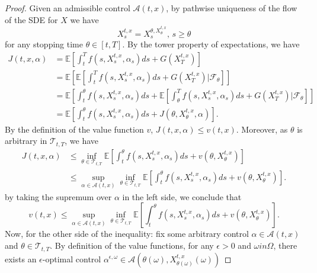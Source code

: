 \begin{proof}
    Given an admissible control $\mathcal{A}(t,x)$, by pathwise uniqueness of the flow of the SDE for $X$ we have
    \begin{equation}
        X_s^{t,x} =  X_s^{\theta, X_\theta^{t,x}}, \, s \geq \theta
    \end{equation}
    for any stopping time $\theta \in [t,T]$. By the tower property of expectations, 
    we have
    \begin{align*}
        J(t,x,\alpha) &= \mathbb{E}\left[ \int_t^T f(s, X_s^{t,x}, \alpha_s) ds + G(X_T^{t,x})  \right] \\
        &= \mathbb{E}\left[ \mathbb{E} \left[ \int_t^T f(s, X_s^{t,x}, \alpha_s) ds + G(X_T^{t,x}) | \mathcal{F}_\theta \right] \right] \\
        &= \mathbb{E}\left[  \int_t^\theta f(s,X_s^{t,x}, \alpha_s) ds +  \mathbb{E} \left[ \int_\theta^T f(s, X_s^{t,x}, \alpha_s) ds + G(X_T^{t,x}) | \mathcal{F}_\theta \right] \right]\\ 
        &= \mathbb{E}\left[  \int_t^\theta f(s,X_s^{t,x}, \alpha_s) ds +  J(\theta, X_\theta^{t,x}, \alpha) \right].
    \end{align*}
    By the definition of the value function $v$, $J(t,x,\alpha) \leq v(t,x)$.
    Moreover, as $\theta$ is arbitrary in $\mathcal{T}_{t,T}$, we have
    \begin{align*}
        J(t,x,\alpha) &\leq \inf_{\theta \in \mathcal{T}_{t,T}} \mathbb{E}\left[ \int_t^\theta f(s, X_s^{t,x}, \alpha_s) ds  + v(\theta, X_\theta^{t,x})\right] \\
        & \leq \sup_{\alpha \in \mathcal{A}(t,x)} \inf_{\theta \in \mathcal{T}_{t,T}} \mathbb{E}\left[ \int_t^\theta f(s,X^{t,x}_s, \alpha_s) ds + v(\theta, X_\theta^{t,x}) \right]. 
    \end{align*}
    by taking the supremum over $\alpha$ in the left side, we conclude that
    \begin{equation}
        v(t,x)  \leq \sup_{\alpha \in \mathcal{A}(t,x)} \inf_{\theta \in \mathcal{T}_{t,T}} \mathbb{E}\left[ \int_t^\theta f(s,X^{t,x}_s, \alpha_s) ds + v(\theta, X_\theta^{t,x}) \right]. 
    \end{equation}
    Now, for the other side of the inequality: fix some arbitrary control
    $\alpha \in \mathcal{A}(t,x)$ and $\theta \in \mathcal{T}_{t,T}$.
    By definition of the value functions, for any $\epsilon > 0$ and 
    $\omega in \Omega$, there exists an $\epsilon$-optimal control
    $\alpha^{\epsilon, \omega} \in \mathcal{A}( \theta(\omega), X^{t,x}_{\theta(\omega)} (\omega)  )$

\end{proof}
